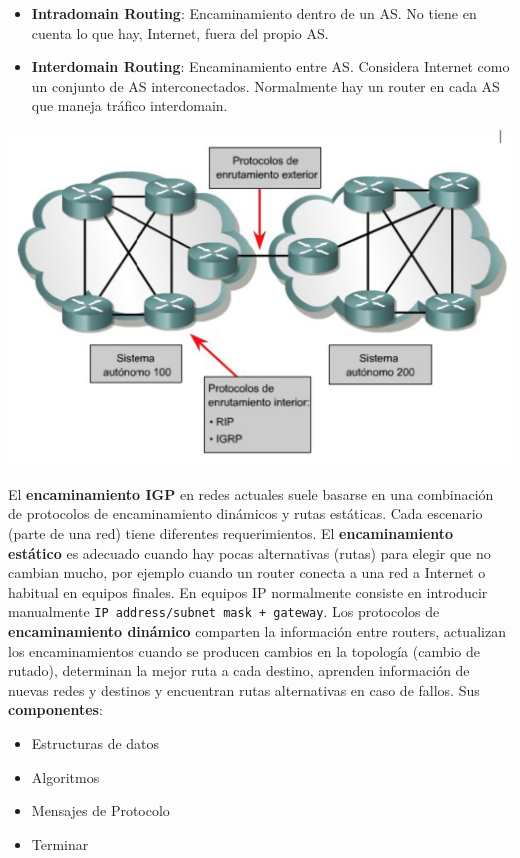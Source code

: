 \documentclass[10pt,portrait, twocolumn]{article}
\begin{document}
	\begin{itemize}
		\item \textbf{Intradomain Routing}: Encaminamiento dentro de un AS. No tiene en cuenta lo que hay, Internet, fuera del propio AS.
		\item \textbf{Interdomain Routing}: Encaminamiento entre AS. Considera Internet como un conjunto de AS interconectados. Normalmente hay un router en cada AS que maneja tráfico interdomain.
	\end{itemize}
	
	\begin{center}
		\includegraphics[scale = .5]{InterIntra}
	\end{center}
	
El \textbf{encaminamiento IGP} en redes actuales suele basarse en una combinación de protocolos de encaminamiento dinámicos y rutas estáticas. Cada escenario (parte de una red) tiene diferentes requerimientos. El \textbf{encaminamiento estático} es adecuado cuando hay pocas alternativas (rutas) para elegir que no cambian mucho, por ejemplo cuando un router conecta a una red a Internet o habitual en equipos finales. En equipos IP normalmente consiste en introducir manualmente \texttt{IP address/subnet mask + gateway}. Los protocolos de \textbf{encaminamiento dinámico} comparten la información entre routers, actualizan los encaminamientos cuando se producen cambios en la topología (cambio de rutado), determinan la mejor ruta a cada destino, aprenden información de nuevas redes y destinos y encuentran rutas alternativas en caso de fallos. Sus \textbf{componentes}:

	\begin{itemize}
		\item Estructuras de datos
		\item Algoritmos
		\item Mensajes de Protocolo
		\item Terminar
	\end{itemize}
	
\end{document}
